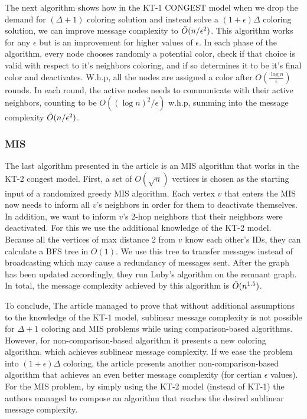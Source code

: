 \documentclass[11pt]{article}
\begin{document}
The next algorithm shows how in the KT-1 CONGEST model when we drop the demand for $(\Delta+1)$ coloring solution and instead solve a $(1+\epsilon)\Delta$ coloring solution, we can improve message complexity to $\Tilde{O}(n/\epsilon^2)$. This algorithm works for any $\epsilon$ but is an improvement for higher values of $\epsilon$.
In each phase of the algorithm, every node chooses randomly a potential color, check if that choice is valid with respect to it's neighbors coloring, and if so determines it to be it's final color and deactivates. W.h.p, all the nodes are assigned a color after $O(\frac{\log{n}}{\epsilon})$ rounds. In each round, the active nodes needs to communicate with their active neighbors, counting to be $O((\log{n})^{2}/ \epsilon)$ w.h.p, summing into the message complexity $\Tilde{O}(n/\epsilon^2)$.

\subsubsection*{MIS}

The last algorithm presented in the article is an MIS algorithm that works in the KT-2 congest model. First, a set of $O(\sqrt{n})$ vertices is chosen as the starting input of a randomized greedy MIS algorithm. Each vertex $v$ that enters the MIS now needs to inform all $v$'s neighbors in order for them to deactivate themselves. In addition, we want to inform $v$'s 2-hop neighbors that their neighbors were deactivated. For this we use the additional knowledge of the KT-2 model. Because all the vertices of max distance 2 from $v$ know each other's IDs, they can calculate a BFS tree in $O(1)$. We use this tree to transfer messages instead of broadcasting which may cause a redundancy of messages sent. After the graph has been updated accordingly, they run Luby's \cite{Luby} algorithm on the remnant graph. In total, the message complexity achieved by this algorithm is $\Tilde{O}(n^{1.5})$.

To conclude, The article managed to prove that without additional assumptions to the knowledge of the KT-1 model, sublinear message complexity is not possible for $\Delta + 1$ coloring and MIS problems while using comparison-based algorithms. However, for non-comparison-based algorithm it presents a new coloring algorithm, which achieves sublinear message complexity. If we ease the problem into $(1+\epsilon)\Delta$ coloring, the article presents another non-comparison-based algorithm that achieves an even better message complexity (for certian $\epsilon$ values). For the MIS problem, by simply using the KT-2 model (instead of KT-1) the authors managed to compose an algorithm that reaches the desired sublinear message complexity.
\end{document}
